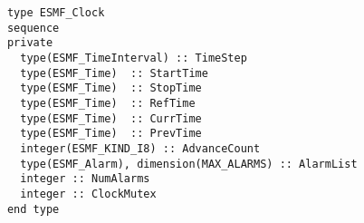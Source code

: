 \begin{verbatim}
      type ESMF_Clock
      sequence
      private
        type(ESMF_TimeInterval) :: TimeStep
        type(ESMF_Time)  :: StartTime
        type(ESMF_Time)  :: StopTime
        type(ESMF_Time)  :: RefTime
        type(ESMF_Time)  :: CurrTime
        type(ESMF_Time)  :: PrevTime
        integer(ESMF_KIND_I8) :: AdvanceCount
        type(ESMF_Alarm), dimension(MAX_ALARMS) :: AlarmList
        integer :: NumAlarms
        integer :: ClockMutex
      end type
\end{verbatim}
